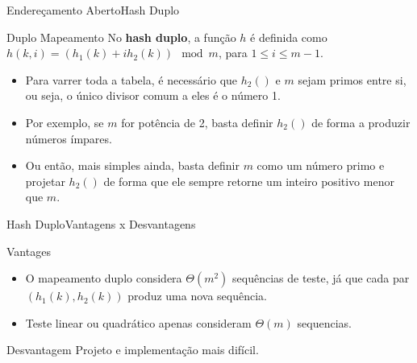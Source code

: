\documentclass[aspectratio=169]{beamer}
\begin{document}
\begin{frame}{Endereçamento Aberto}{Hash Duplo}
\begin{block}{Duplo Mapeamento}
No {\bf hash duplo}, a função $h$ é definida como $h(k, i) = (h_1 (k) + i h_2 (k)) \mod m$, para $1 \leq i \leq m-1$.
\end{block}
\begin{itemize}
\item Para varrer toda a tabela, é necessário que $h_2()$ e $m$ sejam primos entre si, ou seja, o único divisor comum a eles é o número 1.
\item Por exemplo, se $m$ for potência de 2, basta definir $h_2()$ de forma a produzir números ímpares.
\item Ou então, mais simples ainda, basta definir $m$ como um número primo e projetar $h_2()$ de forma que ele sempre retorne um inteiro positivo menor que $m$.
\end{itemize}
\end{frame}

\begin{frame}{Hash Duplo}{Vantagens x Desvantagens}
\begin{block}{Vantages}
\begin{itemize}
\item O mapeamento duplo considera $\Theta(m^2)$ sequências de teste, já que cada par $(h_1 (k), h_2 (k))$ produz uma nova sequência.
\item Teste linear ou quadrático apenas consideram $\Theta(m)$ sequencias.
\end{itemize}
\end{block}
\begin{block}{Desvantagem}
Projeto e implementação mais difícil.
\end{block} 
\end{frame}


\end{document}
